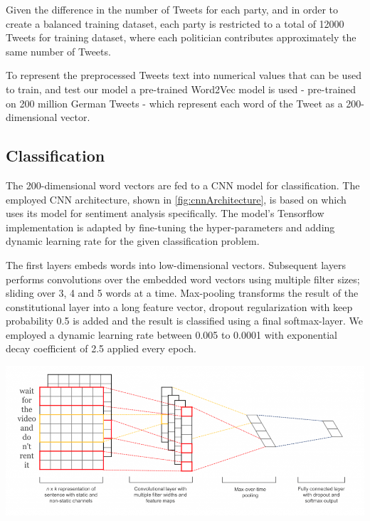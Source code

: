 \documentclass[10pt, oneside]{article}
\newenvironment{Figure}
	{\par\medskip\noindent\minipage{\linewidth}}
	{\endminipage\par\medskip}
\begin{document}
\begin{multicols}{2}
Given the difference in the number of Tweets for each party, and in order to create a balanced training dataset, each party is restricted to a total of 12000 Tweets for training dataset, where each politician contributes approximately the same number of Tweets.

To represent the preprocessed Tweets text into numerical values that can be used to train, and test our model a pre-trained Word2Vec model is used \cite{DBLP:journals/corr/abs-1301-3781} - pre-trained on 200 million German Tweets \cite{cieliebak2017twitter} - which represent each word of the Tweet as a 200-dimensional vector.

\subsection{Classification}

The 200-dimensional word vectors are fed to a CNN model for classification.
The employed CNN architecture, shown in \autoref{fig:cnnArchitecture},  is based on \cite{Kim2014} which uses its model for sentiment analysis specifically. The model's Tensorflow implementation \cite{Wildml2015} is adapted by fine-tuning the hyper-parameters and adding dynamic learning rate for the given classification problem.

The first layers embeds words into low-dimensional vectors. Subsequent layers performs convolutions over the embedded word vectors using multiple filter sizes; sliding over 3, 4 and 5 words at a time. Max-pooling transforms the result of the constitutional layer into a long feature vector, dropout regularization with keep probability 0.5 is added and the result is classified using a final softmax-layer. We employed a dynamic learning rate between 0.005 to 0.0001 with exponential decay coefficient of 2.5 applied every epoch.

\begin{Figure}
	\centering
	\includegraphics[width=\linewidth]{images/cnn_architecture1.png}
	\label{fig:cnnArchitecture}
\end{Figure}


\end{multicols}
\end{document}
